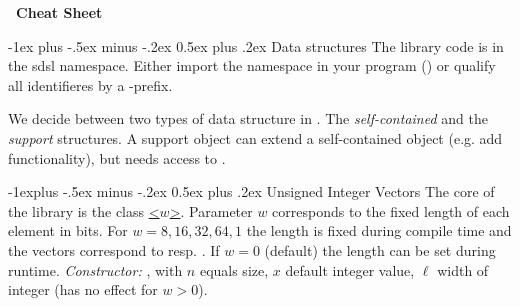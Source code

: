 \documentclass[10pt,landscape]{article}
\makeatletter
\renewcommand{\section}{\@startsection{section}{1}{0mm}%
                                {-1ex plus -.5ex minus -.2ex}%
                                {0.5ex plus .2ex}%
                                {\normalfont\large\bfseries}}
\renewcommand{\subsection}{\@startsection{subsection}{2}{0mm}%
                                {-1explus -.5ex minus -.2ex}%
                                {0.5ex plus .2ex}%
                                {\normalfont\normalsize\bfseries}}
\makeatother
\begin{document}
\begin{multicols}{3}
\newcommand{\sdsllcpbitcompressed}{\code{lcp\_bitcompressed}}
\newcommand{\sdsllcpdac}{\code{lcp\_dac}}
\newcommand{\sdsllcpvlc}{\code{lcp\_vlc}}
\newcommand{\sdsllcpbyte}{\code{lcp\_byte}}
\newcommand{\sdsllcpsupportsada}{\code{lcp\_support\_sada}}
\newcommand{\sdsllcpwt}{\code{lcp\_wt}}
\newcommand{\sdsllcpsupporttree}{\code{lcp\_support\_tree}}
\newcommand{\sdsllcpsupporttreeII}{\code{lcp\_support\_tree2}}
\newcommand{\sdslbpsupportg}{\code{bp\_support\_g}}
\newcommand{\sdslbpsupportgg}{\code{bp\_support\_gg}}
\newcommand{\sdslbpsupportsada}{\code{bp\_support\_sada}}
\newcommand{\sdslcstsada}{\code{cst\_sada}}
\newcommand{\sdslcstsctIII}{\code{cst\_sct3}}
\newcommand{\sdslrmqsupportsparsetable}{\code{rmq\_support\_sparse\_table}}
\newcommand{\sdslrmqsuccinctsada}{\code{rmq\_succint\_sada}}
\newcommand{\sdslrmqsuccinctsct}{\code{rmq\_succint\_sct}}

\begin{center}
     \Large{\textbf{\sdsl\ Cheat Sheet}} \\
\end{center}

\section{Data structures}
The library code is in the sdsl namespace. Either import
the namespace in your program () or
qualify all identifieres by a -prefix.

We decide between two types of data structure in \sdsl.
The \emph{self-contained} and the \emph{support}
structures. A support object  can extend
a self-contained object  (e.g. add functionality), but 
needs access to . 

\subsection{Unsigned Integer Vectors}
The core of the library is the class 
\href{\sdslgit/include/sdsl/int_vector.hpp}{\sdslintvector\textless$w$\textgreater}.
Parameter $w$ corresponds to the fixed length of each
element in bits.  For $w=8,16,32,64,1$ the length is
fixed during compile time and the vectors
correspond to \href{http://www.sgi.com/tech/stl/Vector.html}{}
resp. .
If $w=0$ (default) the length can be set during runtime.
\textit{Constructor:} \sdslintvectorZ{}, with 
$n$ equals size, $x$ default integer value, $\ell$ width
of integer (has no effect for $w>0$).


\end{multicols}
\end{document}
